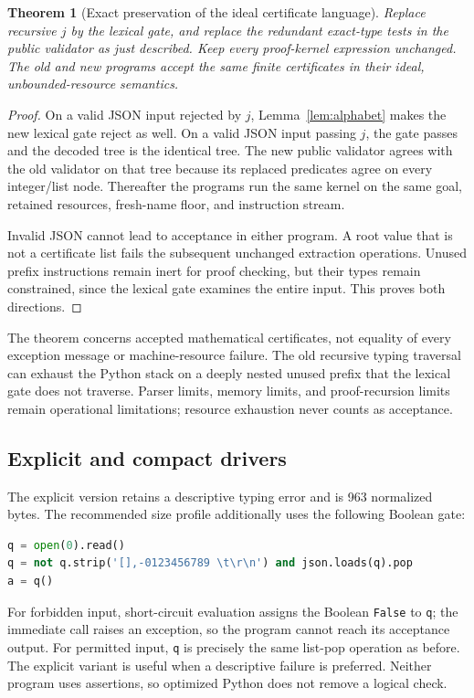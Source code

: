 \documentclass[11pt,a4paper]{article}
\newtheorem{theorem}{Theorem}[section]
\theoremstyle{definition}\newtheorem{definition}[theorem]{Definition}
\begin{document}
\begin{theorem}[Exact preservation of the ideal certificate language]
\label{thm:lexical}
Replace recursive $j$ by the lexical gate, and replace the redundant
exact-type tests in the public validator as just described. Keep every
proof-kernel expression unchanged. The old and new programs accept the
same finite certificates in their ideal, unbounded-resource semantics.
\end{theorem}
\begin{proof}
On a valid JSON input rejected by $j$, Lemma~\ref{lem:alphabet} makes
the new lexical gate reject as well. On a valid JSON input passing $j$,
the gate passes and the decoded tree is the identical tree. The new
public validator agrees with the old validator on that tree because
its replaced predicates agree on every integer/list node. Thereafter
the programs run the same kernel on the same goal, retained resources,
fresh-name floor, and instruction stream.

Invalid JSON cannot lead to acceptance in either program. A root value
that is not a certificate list fails the subsequent unchanged extraction
operations. Unused prefix instructions remain inert for proof checking,
but their types remain constrained, since the lexical gate examines the
entire input. This proves both directions.
\end{proof}

The theorem concerns accepted mathematical certificates, not equality of
every exception message or machine-resource failure. The old recursive
typing traversal can exhaust the Python stack on a deeply nested unused
prefix that the lexical gate does not traverse. Parser limits, memory
limits, and proof-recursion limits remain operational limitations;
resource exhaustion never counts as acceptance.

\subsection{Explicit and compact drivers}

The explicit version retains a descriptive typing error and is 963
normalized bytes. The recommended size profile additionally uses the
following Boolean gate:
\begin{lstlisting}[language=Python]
q = open(0).read()
q = not q.strip('[],-0123456789 \t\r\n') and json.loads(q).pop
a = q()
\end{lstlisting}
For forbidden input, short-circuit evaluation assigns the Boolean
\texttt{False} to \texttt{q}; the immediate call raises an exception, so
the program cannot reach its acceptance output. For permitted input,
\texttt{q} is precisely the same list-pop operation as before. The
explicit variant is useful when a descriptive failure is preferred.
Neither program uses assertions, so optimized Python does not remove a
logical check.
\end{document}
